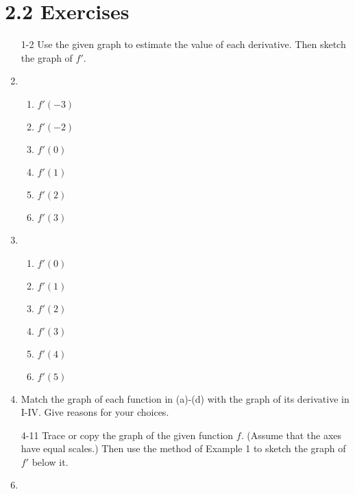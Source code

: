 \documentclass{article}
\begin{document}
	\section{2.2 Exercises}

	\begin{enumerate}

		\item[1-2] Use the given graph to estimate the value of each derivative.
			Then sketch the graph of $f'$.

		\item
		\begin{enumerate}
			\item $f'(-3)$

			\item $f'(-2)$

			\item $f'(0)$

			\item $f'(1)$

			\item $f'(2)$

			\item $f'(3)$
		\end{enumerate}

		\item
		\begin{enumerate}
			\item $f'(0)$

			\item $f'(1)$

			\item $f'(2)$

			\item $f'(3)$

			\item $f'(4)$

			\item $f'(5)$
		\end{enumerate}

		\item Match the graph of each function in (a)-(d) with the graph
			of its derivative in I-IV. Give reasons for your choices.

		\item[4-11] Trace or copy the graph of the given function $f$. (Assume
				that the axes have equal scales.) Then use the method
				of Example 1 to sketch the graph of $f'$ below it.

		\item


\end{enumerate}
\end{document}
